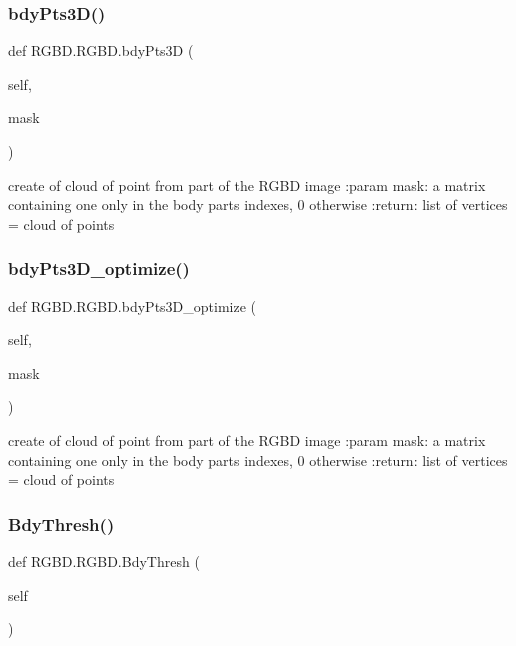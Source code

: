 \subsubsection{\texorpdfstring{bdy\+Pts3\+D()}{bdyPts3D()}}
{\footnotesize\ttfamily def R\+G\+B\+D.\+R\+G\+B\+D.\+bdy\+Pts3D (\begin{DoxyParamCaption}\item[{}]{self,  }\item[{}]{mask }\end{DoxyParamCaption})}

\begin{DoxyVerb}create of cloud of point from part of the RGBD image
:param mask: a matrix containing one only in the body parts indexes, 0 otherwise
:return:  list of vertices = cloud of points
\end{DoxyVerb}
 \mbox{\label{class_r_g_b_d_1_1_r_g_b_d_a7565e3c0d9929b23e94ce900df4af67a}} 
\subsubsection{\texorpdfstring{bdy\+Pts3\+D\+\_\+optimize()}{bdyPts3D\_optimize()}}
{\footnotesize\ttfamily def R\+G\+B\+D.\+R\+G\+B\+D.\+bdy\+Pts3\+D\+\_\+optimize (\begin{DoxyParamCaption}\item[{}]{self,  }\item[{}]{mask }\end{DoxyParamCaption})}

\begin{DoxyVerb}create of cloud of point from part of the RGBD image
:param mask: a matrix containing one only in the body parts indexes, 0 otherwise
:return:  list of vertices = cloud of points
\end{DoxyVerb}
 \mbox{\label{class_r_g_b_d_1_1_r_g_b_d_ad9c546e3a447805ff908cbc072efe6e5}} 
\subsubsection{\texorpdfstring{Bdy\+Thresh()}{BdyThresh()}}
{\footnotesize\ttfamily def R\+G\+B\+D.\+R\+G\+B\+D.\+Bdy\+Thresh (\begin{DoxyParamCaption}\item[{}]{self }\end{DoxyParamCaption})}

